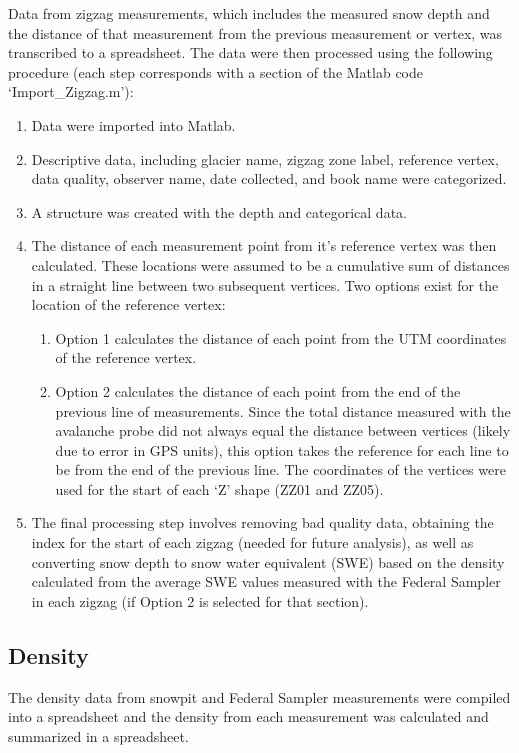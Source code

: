 \documentclass[12pt]{article}
\begin{document}
Data from zigzag measurements, which includes the measured snow depth and the distance of that measurement from the previous measurement or vertex, was transcribed to a spreadsheet. The data were then processed using the following procedure (each step corresponds with a section of the Matlab code `Import\_Zigzag.m'):
\begin{enumerate}
\item Data were imported into Matlab.
\item Descriptive data, including glacier name, zigzag zone label, reference vertex, data quality, observer name, date collected, and book name were categorized.
\item A structure was created with the depth and categorical data.
\item The distance of each measurement point from it's reference vertex was then calculated. These locations were assumed to be a cumulative sum of distances in a straight line between two subsequent vertices. Two options exist for the location of the reference vertex:
 	\begin{enumerate}
	\item Option 1 calculates the distance of each point from the UTM coordinates of the reference vertex.
	\item Option 2 calculates the distance of each point from the end of the previous line of measurements. Since the total distance measured with the avalanche probe did not always equal the distance between vertices (likely due to error in GPS units), this option takes the reference for each line to be from the end of the previous line. The coordinates of the vertices were used for the start of each `Z' shape (ZZ01 and ZZ05).
	\end{enumerate}
\item The final processing step involves removing bad quality data, obtaining the index for the start of each zigzag (needed for future analysis), as well as converting snow depth to snow water equivalent (SWE) based on the density calculated from the average SWE values measured with the Federal Sampler in each zigzag (if Option 2 is selected for that section).  
\end{enumerate}

\subsection{Density}

The density data from snowpit and Federal Sampler measurements were compiled into a spreadsheet and the density from each measurement was calculated and summarized in a spreadsheet. 
\end{document}
